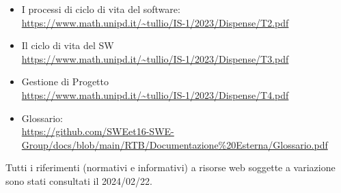         \begin{itemize}
            \item I processi di ciclo di vita del software: \\
            \url{https://www.math.unipd.it/~tullio/IS-1/2023/Dispense/T2.pdf}
            \item Il ciclo di vita del SW\\
            \url{https://www.math.unipd.it/~tullio/IS-1/2023/Dispense/T3.pdf}
            \item Gestione di Progetto\\
            \url{https://www.math.unipd.it/~tullio/IS-1/2023/Dispense/T4.pdf}
            \item Glossario: \\
            \url{https://github.com/SWEet16-SWE-Group/docs/blob/main/RTB/Documentazione%20Esterna/Glossario.pdf}
        \end{itemize}

        Tutti i riferimenti (normativi e informativi) a risorse web soggette a variazione sono stati consultati il 2024/02/22.


